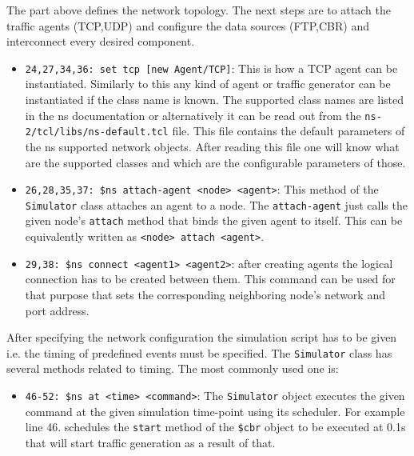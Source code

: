 \documentclass[a4paper]{article}
\begin{document}
The part above defines the network topology. The next steps are to attach the traffic agents (TCP,UDP) and configure
the data sources (FTP,CBR) and interconnect every desired component.

\begin{itemize}%

    \item \verb!24,27,34,36: set tcp [new Agent/TCP]!: This is how a TCP agent can be instantiated. Similarly to this any kind of agent or
          traffic generator can be instantiated if the class name is known. The supported class names are listed in the ns
          documentation or alternatively it can be read out from the \verb!ns-2/tcl/libs/ns-default.tcl! file. This file contains the default
          parameters of the ns supported network objects. After reading this file one will know what are the supported classes
          and which are the configurable parameters of those.

    \item \verb!26,28,35,37: $ns attach-agent <node> <agent>!: This method of the \verb!Simulator! class attaches an agent to a node. The
          \verb!attach-agent! just calls the given node's \verb!attach! method that binds the given agent to
          itself. This can be equivalently written as \verb!<node> attach <agent>!.

    \item \verb!29,38: $ns connect <agent1> <agent2>!: after creating agents the logical connection has to be created between them. This
          command can be used for that purpose that sets the corresponding neighboring node's network and port address.

\end{itemize}

After specifying the network configuration the simulation script has to be given i.e. the timing of predefined events
must be specified. The \verb!Simulator! class has several methods related to timing. The most commonly used one
is:

\begin{itemize}

    \item \verb!46-52: $ns at <time> <command>!: The \verb!Simulator! object executes the given command at the given simulation
          time-point  using its scheduler. For example line 46. schedules the \verb!start! method of the
          \verb!$cbr! object to be executed at 0.1s that will start traffic generation as a result of that.

\end{itemize}
\end{document}
